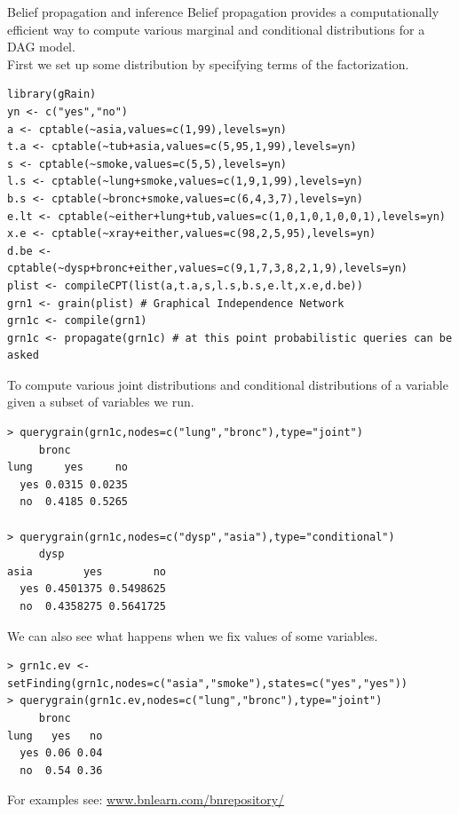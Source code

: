 \documentclass[dvipsnames,aspectratio=169]{beamer} %
\begin{document}

\begin{frame}[fragile]{Belief propagation and inference}
	Belief propagation provides a computationally efficient way to compute various marginal and conditional distributions for a DAG model.\\[.2cm]
First we set up some distribution by specifying terms of the factorization.
	\begin{lstlisting}
library(gRain)
yn <- c("yes","no")
a <- cptable(~asia,values=c(1,99),levels=yn)
t.a <- cptable(~tub+asia,values=c(5,95,1,99),levels=yn)
s <- cptable(~smoke,values=c(5,5),levels=yn)
l.s <- cptable(~lung+smoke,values=c(1,9,1,99),levels=yn)
b.s <- cptable(~bronc+smoke,values=c(6,4,3,7),levels=yn)
e.lt <- cptable(~either+lung+tub,values=c(1,0,1,0,1,0,0,1),levels=yn)
x.e <- cptable(~xray+either,values=c(98,2,5,95),levels=yn)
d.be <- cptable(~dysp+bronc+either,values=c(9,1,7,3,8,2,1,9),levels=yn)
plist <- compileCPT(list(a,t.a,s,l.s,b.s,e.lt,x.e,d.be))
grn1 <- grain(plist) # Graphical Independence Network
grn1c <- compile(grn1)
grn1c <- propagate(grn1c) # at this point probabilistic queries can be asked\end{lstlisting}
\end{frame}


\begin{frame}[fragile]{}
		To compute various joint distributions and conditional distributions of a variable given a subset of variables we run.
\begin{lstlisting}
> querygrain(grn1c,nodes=c("lung","bronc"),type="joint")
     bronc
lung     yes     no
  yes 0.0315 0.0235
  no  0.4185 0.5265
  
> querygrain(grn1c,nodes=c("dysp","asia"),type="conditional")
     dysp
asia        yes        no
  yes 0.4501375 0.5498625
  no  0.4358275 0.5641725
\end{lstlisting}
We can also see what happens when we fix values of some variables. 
\begin{lstlisting}
> grn1c.ev <- setFinding(grn1c,nodes=c("asia","smoke"),states=c("yes","yes"))
> querygrain(grn1c.ev,nodes=c("lung","bronc"),type="joint")
     bronc
lung   yes   no
  yes 0.06 0.04
  no  0.54 0.36
\end{lstlisting}
For examples see: \url{www.bnlearn.com/bnrepository/}
\end{frame}
\end{document}
